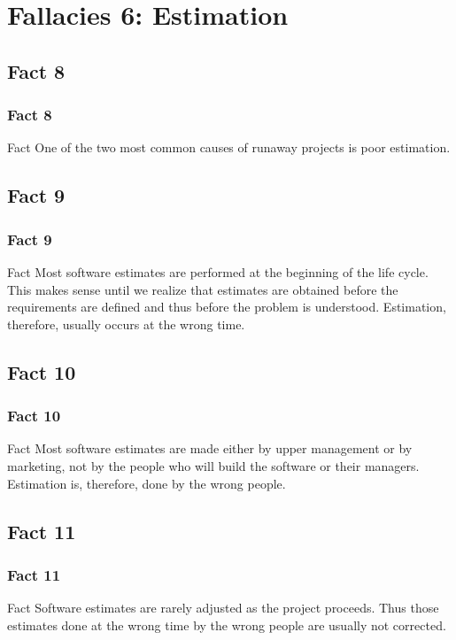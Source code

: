 \documentclass{beamer}
\begin{document}
\section{Fallacies 6: Estimation}

\subsection{Fact 8}
\begin{frame}
    \frametitle{Fact 8}
    \begin{block}{Fact}
    One of the two most common causes of runaway projects is poor estimation.
    \end{block}
\end{frame}

\subsection{Fact 9}
\begin{frame}
    \frametitle{Fact 9}
    \begin{block}{Fact}
    Most software estimates are performed at the beginning of the life cycle.
    This makes sense until we realize that estimates are obtained before the
    requirements are defined and thus before the problem is understood.
    Estimation, therefore, usually occurs at the wrong time.
    \end{block}
\end{frame}

\subsection{Fact 10}
\begin{frame}
    \frametitle{Fact 10}
    \begin{block}{Fact}
    Most software estimates are made either by upper management or by marketing,
    not by the people who will build the software or their managers. Estimation
    is, therefore, done by the wrong people.
    \end{block}
\end{frame}

\subsection{Fact 11}
\begin{frame}
    \frametitle{Fact 11}
    \begin{block}{Fact}
    Software estimates are rarely adjusted as the project proceeds. Thus those
    estimates done at the wrong time by the wrong people are usually not
    corrected.
    \end{block}
\end{frame}
\end{document}
